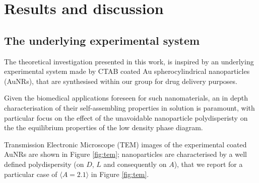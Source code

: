 \documentclass[journal=jacsat,manuscript=article]{achemso}
\begin{document}
\section{Results and discussion}

%

\subsection{The underlying experimental system}



The theoretical investigation presented in this work, is inspired by an underlying experimental system made by CTAB  coated Au spherocylindrical nanoparticles (AuNRs), that are synthesised within our group  for drug delivery purposes.

Given the biomedical applications foreseen for such nanomaterials, an in depth characterisation of their self-assembling properties in solution is paramount, with particular focus on the effect of the unavoidable nanoparticle polydisperisty on the the equilibrium properties of the low  density phase diagram.

Transmission Electronic Microscope (TEM) images of the  experimental coated AuNRs are shown in  Figure \ref{fig:tem}; 
nanoparticles are characterised by a well defined polydispersity (on $D$, $L$ and consequently on $A$), that we report for a particular case of  $\langle A=2.1 \rangle$ in Figure \ref{fig:tem}.


\end{document}
